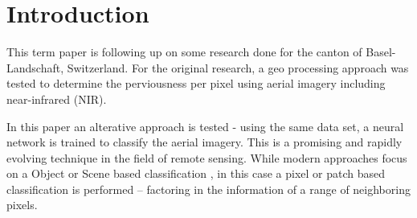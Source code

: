 

\section{Introduction}
\label{introduction}

This term paper is following up on some research done for the canton of Basel-Landschaft, Switzerland.
For the original research, a geo processing approach was tested to determine the perviousness
per pixel using aerial imagery including near-infrared (NIR).


In this paper an alterative approach is tested - using the same data set, 
a neural network is trained to classify the aerial imagery.
This is a promising and rapidly evolving technique in the field of remote sensing.
While modern approaches focus on a Object or Scene based classification \autocite{thapaDeepLearningRemote2023},
in this case a pixel or patch based classification is performed -- factoring in the information of a range of neighboring pixels.

